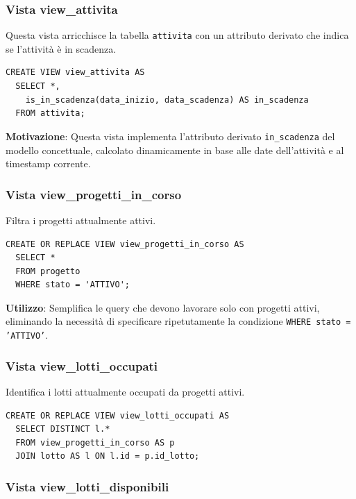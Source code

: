 \documentclass[12pt,a4paper]{article}
\begin{document}
\subsubsection{Vista view\_attivita}

Questa vista arricchisce la tabella \texttt{attivita} con un attributo derivato che indica se l'attività è in scadenza.

\begin{lstlisting}[style=sqlstyle]
CREATE VIEW view_attivita AS 
  SELECT *, 
    is_in_scadenza(data_inizio, data_scadenza) AS in_scadenza
  FROM attivita;
\end{lstlisting}

\textbf{Motivazione}: Questa vista implementa l'attributo derivato \texttt{in\_scadenza} del modello concettuale, calcolato dinamicamente in base alle date dell'attività e al timestamp corrente.

\subsubsection{Vista view\_progetti\_in\_corso}

Filtra i progetti attualmente attivi.

\begin{lstlisting}[style=sqlstyle]
CREATE OR REPLACE VIEW view_progetti_in_corso AS
  SELECT * 
  FROM progetto 
  WHERE stato = 'ATTIVO';
\end{lstlisting}

\textbf{Utilizzo}: Semplifica le query che devono lavorare solo con progetti attivi, eliminando la necessità di specificare ripetutamente la condizione \texttt{WHERE stato = 'ATTIVO'}.

\subsubsection{Vista view\_lotti\_occupati}

Identifica i lotti attualmente occupati da progetti attivi.

\begin{lstlisting}[style=sqlstyle]
CREATE OR REPLACE VIEW view_lotti_occupati AS 
  SELECT DISTINCT l.* 
  FROM view_progetti_in_corso AS p
  JOIN lotto AS l ON l.id = p.id_lotto;
\end{lstlisting}

\subsubsection{Vista view\_lotti\_disponibili}
\end{document}
